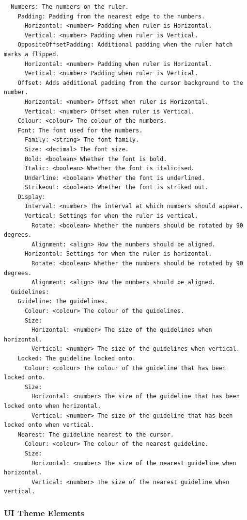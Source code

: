 \documentclass[
]{book}
\begin{document}
\begin{verbatim}
  Numbers: The numbers on the ruler.
    Padding: Padding from the nearest edge to the numbers.
      Horizontal: <number> Padding when ruler is Horizontal.
      Vertical: <number> Padding when ruler is Vertical.
    OppositeOffsetPadding: Additional padding when the ruler hatch marks a flipped.
      Horizontal: <number> Padding when ruler is Horizontal.
      Vertical: <number> Padding when ruler is Vertical.
    Offset: Adds additional padding from the cursor background to the number.
      Horizontal: <number> Offset when ruler is Horizontal.
      Vertical: <number> Offset when ruler is Vertical.
    Colour: <colour> The colour of the numbers.
    Font: The font used for the numbers.
      Family: <string> The font family.
      Size: <decimal> The font size.
      Bold: <boolean> Whether the font is bold.
      Italic: <boolean> Whether the font is italicised.
      Underline: <boolean> Whether the font is underlined.
      Strikeout: <boolean> Whether the font is striked out.
    Display:
      Interval: <number> The interval at which numbers should appear.
      Vertical: Settings for when the ruler is vertical.
        Rotate: <boolean> Whether the numbers should be rotated by 90 degrees.
        Alignment: <align> How the numbers should be aligned.
      Horizontal: Settings for when the ruler is horizontal.
        Rotate: <boolean> Whether the numbers should be rotated by 90 degrees.
        Alignment: <align> How the numbers should be aligned.
  Guidelines:
    Guideline: The guidelines.
      Colour: <colour> The colour of the guidelines.
      Size:
        Horizontal: <number> The size of the guidelines when horizontal.
        Vertical: <number> The size of the guidelines when vertical.
    Locked: The guideline locked onto.
      Colour: <colour> The colour of the guideline that has been locked onto.
      Size:
        Horizontal: <number> The size of the guideline that has been locked onto when horizontal.
        Vertical: <number> The size of the guideline that has been locked onto when vertical.
    Nearest: The guideline nearest to the cursor.
      Colour: <colour> The colour of the nearest guideline.
      Size:
        Horizontal: <number> The size of the nearest guideline when horizontal.
        Vertical: <number> The size of the nearest guideline when vertical.
\end{verbatim}

\subsubsection{UI Theme Elements}\label{ui-theme-elements}
\end{document}
